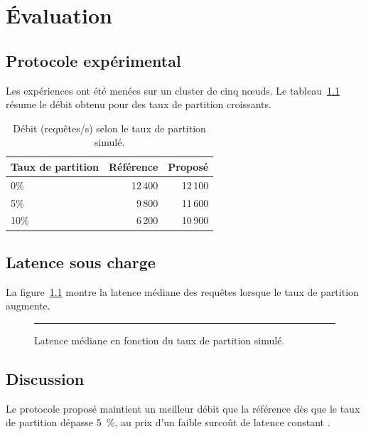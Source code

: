 \chapter{\'Evaluation}
\label{ch:evaluation}

\section{Protocole exp\'erimental}

Les exp\'eriences ont \'et\'e men\'ees sur un cluster de cinq
n\oe{}uds. Le tableau~\ref{tab:resultats} r\'esume le d\'ebit obtenu
pour des taux de partition croissants.

\begin{table}[htbp]
  \centering
  \caption{D\'ebit (requ\^etes/s) selon le taux de partition simul\'e.}
  \label{tab:resultats}
  \begin{tabular}{@{}lrr@{}}
    \toprule
    Taux de partition & R\'ef\'erence & Propos\'e \\
    \midrule
    0\%  & 12\,400 & 12\,100 \\
    5\%  & 9\,800  & 11\,600 \\
    10\% & 6\,200  & 10\,900 \\
    \bottomrule
  \end{tabular}
\end{table}

\section{Latence sous charge}

La figure~\ref{fig:latence} montre la latence m\'ediane des requ\^etes
lorsque le taux de partition augmente.

\begin{figure}[htbp]
  \centering
  \rule{0.6\textwidth}{4cm}
  \caption{Latence m\'ediane en fonction du taux de partition simul\'e.}
  \label{fig:latence}
\end{figure}

\section{Discussion}

Le protocole propos\'e maintient un meilleur d\'ebit que la
r\'ef\'erence d\`es que le taux de partition d\'epasse 5~\%, au prix
d'un faible surco\^ut de latence constant \citep{ongaro2014search}.
